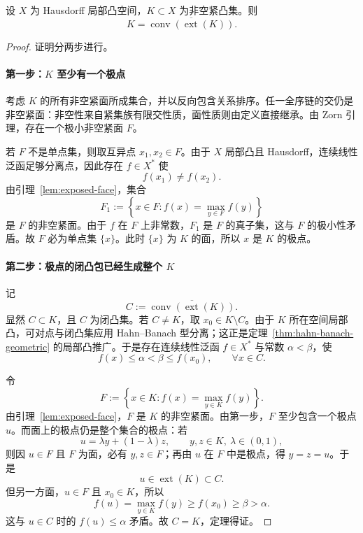 \begin{theorem}\label{thm:krein-milman}
设 $X$ 为 Hausdorff 局部凸空间，$K\subset X$ 为非空紧凸集。则
\[
K=\overline{\operatorname{conv}(\operatorname{ext}(K))}.
\]
\end{theorem}

\begin{proof}
证明分两步进行。

\paragraph{第一步：$K$ 至少有一个极点}

考虑 $K$ 的所有非空紧面所成集合，并以反向包含关系排序。任一全序链的交仍是非空紧面：非空性来自紧集族有限交性质，面性质则由定义直接继承。由 Zorn 引理，存在一个极小非空紧面 $F$。

若 $F$ 不是单点集，则取互异点 $x_1,x_2\in F$。由于 $X$ 局部凸且 Hausdorff，连续线性泛函足够分离点，因此存在 $f\in X^\ast$ 使
\[
f(x_1)\neq f(x_2).
\]
由引理~\ref{lem:exposed-face}，集合
\[
F_1:=\left\{x\in F:f(x)=\max_{y\in F} f(y)\right\}
\]
是 $F$ 的非空紧面。由于 $f$ 在 $F$ 上非常数，$F_1$ 是 $F$ 的真子集，这与 $F$ 的极小性矛盾。故 $F$ 必为单点集 $\{x\}$。此时 $\{x\}$ 为 $K$ 的面，所以 $x$ 是 $K$ 的极点。

\paragraph{第二步：极点的闭凸包已经生成整个 $K$}

记
\[
C:=\overline{\operatorname{conv}(\operatorname{ext}(K))}.
\]
显然 $C\subset K$，且 $C$ 为闭凸集。若 $C\neq K$，取 $x_0\in K\setminus C$。由于 $K$ 所在空间局部凸，可对点与闭凸集应用 Hahn--Banach 型分离；这正是定理~\ref{thm:hahn-banach-geometric} 的局部凸推广。于是存在连续线性泛函 $f\in X^\ast$ 与常数 $\alpha<\beta$，使
\[
f(x)\le \alpha<\beta\le f(x_0),\qquad \forall x\in C.
\]

令
\[
F:=\left\{x\in K:f(x)=\max_{y\in K} f(y)\right\}.
\]
由引理~\ref{lem:exposed-face}，$F$ 是 $K$ 的非空紧面。由第一步，$F$ 至少包含一个极点 $u$。而面上的极点仍是整个集合的极点：若
\[
u=\lambda y+(1-\lambda)z,\qquad y,z\in K,\ \lambda\in(0,1),
\]
则因 $u\in F$ 且 $F$ 为面，必有 $y,z\in F$；再由 $u$ 在 $F$ 中是极点，得 $y=z=u$。于是
\[
u\in \operatorname{ext}(K)\subset C.
\]
但另一方面，$u\in F$ 且 $x_0\in K$，所以
\[
f(u)=\max_{y\in K}f(y)\ge f(x_0)\ge \beta>\alpha.
\]
这与 $u\in C$ 时的 $f(u)\le \alpha$ 矛盾。故 $C=K$，定理得证。
\end{proof}


